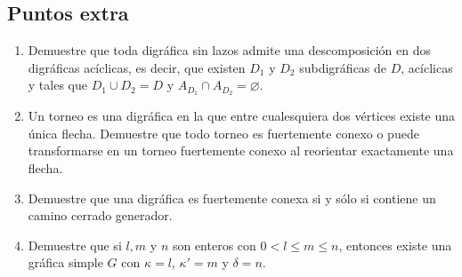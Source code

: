 \documentclass{article}
\begin{document}
\subsection*{Puntos extra}
\begin{enumerate}
\item Demuestre que toda digr\'afica sin lazos admite una
  descomposici\'on en dos digr\'aficas ac\'iclicas, es decir, que
  existen $D_1$ y $D_2$ subdigr\'aficas de $D$, ac\'iclicas y
  tales que $D_1 \cup D_2 = D$ y $A_{D_1} \cap A_{D_2} =
  \varnothing$.

\item Un torneo es una digr\'afica en la que entre cualesquiera
  dos v\'ertices existe una \'unica flecha.   Demuestre que todo
  torneo es fuertemente conexo o puede transformarse en un
  torneo fuertemente conexo al reorientar exactamente una
  flecha.

\item Demuestre que una digr\'afica es fuertemente conexa si
  y s\'olo si contiene un camino cerrado generador.

\item Demuestre que si $l, m$ y $n$ son enteros con $0 < l \le
  m \le n$, entonces existe una gr\'afica simple $G$ con $\kappa
  = l$, $\kappa' = m$ y $\delta = n$.
\end{enumerate}
\end{document}
